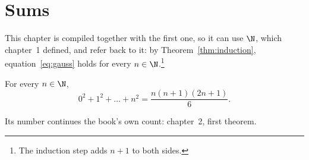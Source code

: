 \chapter{Sums}
This chapter is compiled together with the first one, so it can use
$\N$, which chapter~1 defined, and refer back to it: by
Theorem~\ref{thm:induction}, equation~\eqref{eq:gauss} holds for every
$n \in \N$.\footnote{The induction step adds $n+1$ to both sides.}
\begin{theorem}\label{thm:squares}
For every $n \in \N$,
\[ 0^2 + 1^2 + \dots + n^2 = \frac{n(n+1)(2n+1)}{6}. \]
\end{theorem}
Its number continues the book's own count: chapter~2, first theorem.
